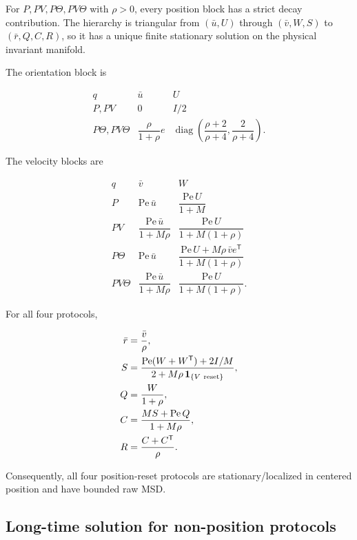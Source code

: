 For \(P,PV,P\Theta,PV\Theta\) with \(\rho>0\), every position block has a strict decay contribution. The hierarchy is triangular from \((\bar u,U)\) through \((\bar v,W,S)\) to \((\bar r,Q,C,R)\), so it has a unique finite stationary solution on the physical invariant manifold.

The orientation block is

\[
\begin{array}{c|cc}
q & \bar u & U\\ \hline
P,PV & 0 & I/2\\[2mm]
P\Theta,PV\Theta
& \dfrac{\rho}{1+\rho}e
& \operatorname{diag}\!\left(\dfrac{\rho+2}{\rho+4},
                              \dfrac{2}{\rho+4}\right).
\end{array}
\]

The velocity blocks are

\[
\begin{array}{c|cc}
q & \bar v & W\\ \hline
P
& \mathrm{Pe}\,\bar u
& \dfrac{\mathrm{Pe}\,U}{1+M}\\[2mm]
PV
& \dfrac{\mathrm{Pe}\,\bar u}{1+M\rho}
& \dfrac{\mathrm{Pe}\,U}{1+M(1+\rho)}\\[2mm]
P\Theta
& \mathrm{Pe}\,\bar u
& \dfrac{\mathrm{Pe}\,U+M\rho\,\bar v e^\mathsf T}
        {1+M(1+\rho)}\\[3mm]
PV\Theta
& \dfrac{\mathrm{Pe}\,\bar u}{1+M\rho}
& \dfrac{\mathrm{Pe}\,U}{1+M(1+\rho)}.
\end{array}
\]

For all four protocols,

\[
\begin{aligned}
\bar r&=\frac{\bar v}{\rho},\\
S&=\frac{\mathrm{Pe}(W+W^\mathsf T)+2I/M}
        {2+M\rho\,\mathbf 1_{\{V\ {\rm reset}\}}},\\
Q&=\frac{W}{1+\rho},\\
C&=\frac{MS+\mathrm{Pe}\,Q}{1+M\rho},\\
R&=\frac{C+C^\mathsf T}{\rho}.
\end{aligned}
\]

Consequently, all four position-reset protocols are stationary/localized in centered position and have bounded raw MSD.



\subsection{Long-time solution for non-position protocols}\label{s3.2-long-time-solution-for-non-position-protocols}

